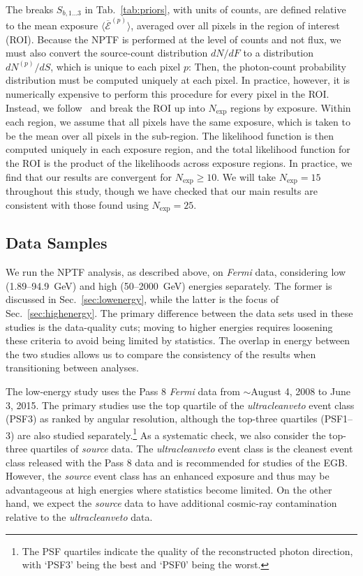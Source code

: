 The breaks $S_{b,1...3}$ in Tab.~\ref{tab:priors}, with units of counts, are defined relative to the mean exposure $\langle \overbar{ \mathcal{E}}^{(p)} \rangle$, averaged over all pixels in the region of interest (ROI).  Because the NPTF is performed at the level of counts and not flux, we must also convert the source-count distribution $dN/dF$ to a distribution $dN^{(p)}/dS$, which is unique to each pixel $p$:
 Then, the photon-count probability distribution must be computed uniquely at each pixel.  In practice, however, it is numerically expensive to perform this procedure for every pixel in the ROI.  Instead, we follow~\cite{Zechlin:2015wdz} and break the ROI up into $N_\text{exp}$ regions by exposure.  Within each region, we assume that all pixels have the same exposure, which is taken to be the mean over all pixels in the sub-region.  The likelihood function is then computed uniquely in each exposure region, and the total likelihood function for the ROI is the product of the likelihoods across exposure regions.  In practice, we find that our results are convergent for $N_\text{exp} \geq 10$.  We will take $N_\text{exp} = 15$ throughout this study, though we have checked that our main results are consistent with those found using $N_\text{exp} = 25$.
 
 \subsection{Data Samples}
 \label{sec:data}
 
 We run the NPTF analysis, as described above, on \emph{Fermi} data, considering low (1.89--94.9~GeV) and high (50--2000~GeV) energies separately.  The former is discussed in Sec.~\ref{sec:lowenergy}, while the latter is the focus of Sec.~\ref{sec:highenergy}.  The primary difference between the data sets used in these studies is the data-quality cuts; moving to higher energies requires loosening these criteria to avoid being limited by statistics.  The overlap in energy between the two studies allows us to compare the consistency of the results when transitioning between analyses.  

The low-energy study uses the Pass 8 \emph{Fermi} data from $\sim$August 4, 2008 to June 3, 2015.  The primary studies use the top quartile of the \emph{ultracleanveto} event class (PSF3) as ranked by angular resolution, although the top-three quartiles (PSF1--3) are also studied separately.\footnote{The PSF quartiles indicate the quality of the reconstructed photon direction, with `PSF3' being the best and `PSF0' being the worst.}  As a systematic check, we also consider the top-three quartiles of {\it source} data.  The \emph{ultracleanveto} event class is the cleanest event class released with the Pass 8 data and is recommended for studies of the EGB.  However, the {\it source} event class has an enhanced exposure and thus may be advantageous at high energies where statistics become limited.  On the other hand, we expect the {\it source} data to have additional cosmic-ray contamination relative to the \emph{ultracleanveto} data.    


